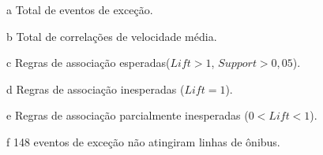 \documentclass[
	12pt,				%
	oneside,			%
	a4paper,			%
	english,			%
	brazil				%
	]{abntex2ppgsi}
\begin{document}
{{\begin{apendicesenv}
\begin{table}[!htb]
\begin{threeparttable}
\begin{tablenotes}
            \item[a] Total de eventos de exceção.
            \item[b] Total de correlações de velocidade média.
            \item[c] Regras de associação esperadas($Lift > 1$, $Support > 0,05$).
            \item[d] Regras de associação inesperadas ($Lift = 1$).
            \item[e] Regras de associação parcialmente inesperadas ($0 < Lift < 1$).
            \item[f] 148 eventos de exceção não atingiram linhas de ônibus.
        \end{tablenotes}
\end{threeparttable}
\end{table}


\end{apendicesenv}}}
\end{document}

